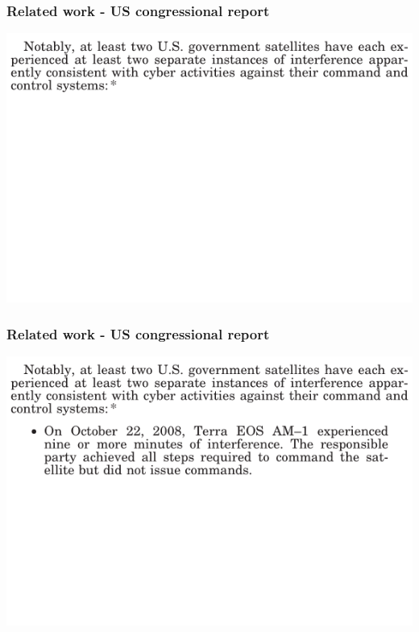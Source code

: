 \documentclass{beamer}
\begin{document}

\begin{frame}
  \frametitle{Related work - US congressional report}
    \includegraphics[width=\textwidth]{images/congress_report_1.png}
\end{frame}
\begin{frame}
  \frametitle{Related work - US congressional report}
    \includegraphics[width=\textwidth]{images/congress_report_2.png}
\end{frame}
\end{document}

